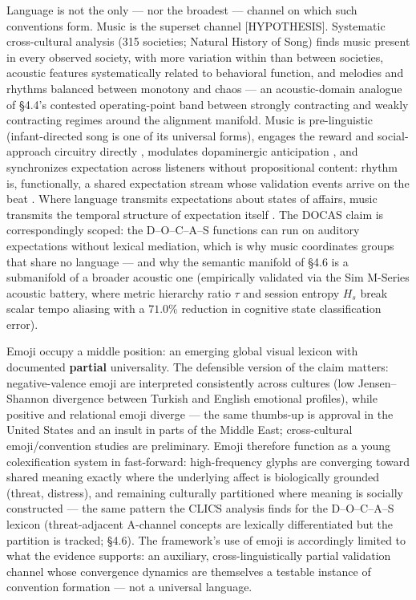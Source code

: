 \documentclass[11pt,twocolumn]{article}
\theoremstyle{plain}
\begin{document}
Language is not the only — nor the broadest — channel on which such conventions form. Music is the superset channel [HYPOTHESIS]. Systematic cross-cultural analysis (315 societies; Natural History of Song) finds music present in every observed society, with more variation within than between societies, acoustic features systematically related to behavioral function, and melodies and rhythms balanced between monotony and chaos \citep{mehr2019} — an acoustic-domain analogue of \S{}4.4's contested operating-point band between strongly contracting and weakly contracting regimes around the alignment manifold. Music is pre-linguistic (infant-directed song is one of its universal forms), engages the reward and social-approach circuitry directly \citep{blood2001,chanda2013}, modulates dopaminergic anticipation \citep{salimpoor2011}, and synchronizes expectation across listeners without propositional content: rhythm is, functionally, a shared expectation stream whose validation events arrive on the beat \citep{huron2006,large1999,london2012}. Where language transmits expectations about states of affairs, music transmits the temporal structure of expectation itself \citep{leman2008,koelsch2014}. The DOCAS claim is correspondingly scoped: the D–O–C–A–S functions can run on auditory expectations without lexical mediation, which is why music coordinates groups that share no language — and why the semantic manifold of \S{}4.6 is a submanifold of a broader acoustic one (empirically validated via the Sim M-Series acoustic battery, where metric hierarchy ratio $\tau$ and session entropy $H_s$ break scalar tempo aliasing with a $71.0\%$ reduction in cognitive state classification error).

Emoji occupy a middle position: an emerging global visual lexicon with documented \textbf{partial} universality. The defensible version of the claim matters: negative-valence emoji are interpreted consistently across cultures (low Jensen–Shannon divergence between Turkish and English emotional profiles), while positive and relational emoji diverge — the same thumbs-up is approval in the United States and an insult in parts of the Middle East; cross-cultural emoji/convention studies are preliminary. Emoji therefore function as a young colexification system in fast-forward: high-frequency glyphs are converging toward shared meaning exactly where the underlying affect is biologically grounded (threat, distress), and remaining culturally partitioned where meaning is socially constructed — the same pattern the CLICS analysis finds for the D–O–C–A–S lexicon (threat-adjacent A-channel concepts are lexically differentiated but the partition is tracked; \S{}4.6). The framework's use of emoji is accordingly limited to what the evidence supports: an auxiliary, cross-linguistically partial validation channel whose convergence dynamics are themselves a testable instance of convention formation — not a universal language.
\end{document}

